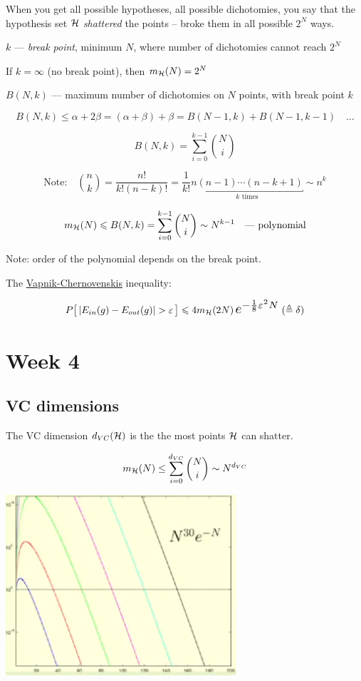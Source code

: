 \documentclass[a4paper,11pt]{article}
\begin{document}
When you get all possible hypotheses, all possible dichotomies,
you say that the hypothesis set $\mathcal{H}$ \emph{shattered} the points --
broke them in all possible $2^N$ ways.

$k$ --- \emph{break point}, minimum $N$, where number of dichotomies cannot reach $2^N$

If $k=\infty$ (no break point), then $m_{\mathcal{H}}(N) = 2^N$

$B(N,k)$ --- maximum number of dichotomies on $N$ points, with break point $k$

\[ B(N,k) \leq \alpha+2\beta = (\alpha+\beta) + \beta = B(N-1,k) + B(N-1,k-1) \quad\ldots \]

\[ B(N,k) = \sum_{i=0}^{k-1} \binom{N}{i} \]

\[ \text{Note:}\quad
   \binom{n}{k} = \frac{n!}{k!(n-k)!}
   = \frac{1}{k!} \underbracket{ n(n-1)\cdots(n-k+1) }_{k\text{ times}} \sim n^k \]

\[ m_{\mathcal{H}}(N) \leqslant B(N,k) = \sum_{i=0}^{k-1} \binom{N}{i} \sim N^{k-1}
   \quad\text{--- polynomial} \]

Note: order of the polynomial depends on the break point.

The \href{https://en.wikipedia.org/wiki/Vapnik%E2%80%93Chervonenkis_theory}{Vapnik-Chernovenskis} inequality:

\[ P \big[\, |\iiEin(g) - \iiEout(g)| > \varepsilon \,\big] \leqslant
   4 \iimH(2N) \, \scalebox{1.4}{$ e^{-\frac18 \varepsilon^2 N} $}
   \; (\triangleq \delta) \]



\section{Week 4}

\subsection{VC dimensions}

\def\iidvc{d_{VC}}

The VC dimension $\iidvc(\iiH)$ is the the most points $\mathcal{H}$ can shatter.

\[ m_{\mathcal{H}}(N) \leq \sum_{i=0}^{d_{VC}} \binom{N}{i} \sim N^{d_{VC}} \]

\includegraphics[scale=1]{plot_n^d_e^-n.png}
\end{document}
